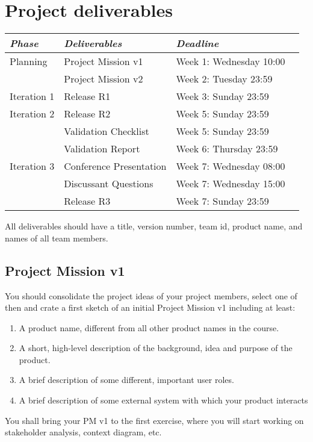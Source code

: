 \documentclass{project}
\begin{document}
\section{Project deliverables}
\begin{tabular}{l |l p{5cm}  l}
{\it Phase} & {\it Deliverables} & {\it Deadline} \\
\hline
Planning & Project Mission v1& Week 1: Wednesday 10:00\\
         & Project Mission v2& Week 2: Tuesday 23:59\\
Iteration 1 & Release R1 & Week 3: Sunday 23:59 \\
Iteration 2 & Release R2  & Week 5: Sunday 23:59\\
            & Validation Checklist & Week 5: Sunday 23:59\\
            & Validation Report & Week 6: Thursday 23:59\\
            Iteration 3 & Conference Presentation & Week 7: Wednesday 08:00\\
            & Discussant Questions & Week 7: Wednesday 15:00\\
            & Release R3 & Week 7: Sunday 23:59\\
      
\end{tabular}
\vskip3mm

\noindent All deliverables should have a title, version number, team id, product name, and names of all team members. 

\subsection{Project Mission v1}

You should consolidate the project ideas of your project members, select one of then and crate a first sketch of an initial Project Mission v1 including at least:
\begin{enumerate}[noitemsep]
  \item A product name, different from all other product names in the course. 
  \item A short, high-level description of the background, idea and purpose of the product. 
  \item A brief description of some different, important user roles.
  \item A brief description of some external system with which your product interacts
\end{enumerate}
You shall bring your PM v1 to the first exercise, where you will start working on stakeholder analysis, context diagram, etc.
\end{document}
